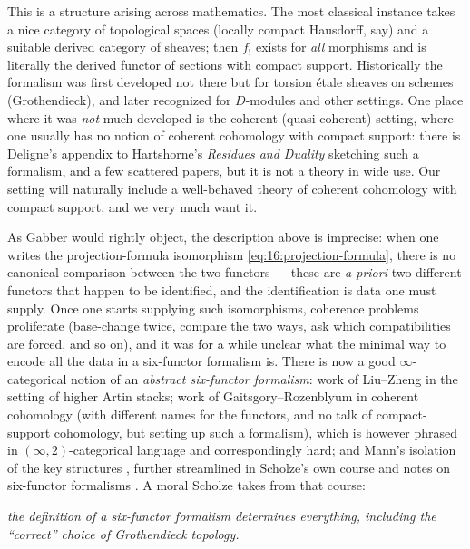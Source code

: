 \begin{remark}
\label{rmk:16:history}
This is a structure arising across mathematics. The most classical instance takes a
nice category of topological spaces (locally compact Hausdorff, say) and a suitable
derived category of sheaves; then $f_!$ exists for \emph{all} morphisms and is
literally the derived functor of sections with compact support. Historically the
formalism was first developed not there but for torsion \'etale sheaves on schemes
(Grothendieck), and later recognized for $D$-modules and other settings. One place
where it was \emph{not} much developed is the coherent (quasi-coherent) setting,
where one usually has no notion of coherent cohomology with compact support: there
is Deligne's appendix to Hartshorne's \emph{Residues and Duality}
\cite{Hartshorne_1966} sketching such a formalism, and a few scattered papers, but
it is not a theory in wide use. Our setting will naturally include a well-behaved
theory of coherent cohomology with compact support, and we very much want it.
\end{remark}

\begin{remark}
\label{rmk:16:abstract-6ff}
As Gabber would rightly object, the description above is imprecise: when one writes
the projection-formula isomorphism \eqref{eq:16:projection-formula}, there is no
canonical comparison between the two functors --- these are \emph{a priori} two
different functors that happen to be identified, and the identification is data one
must supply. Once one starts supplying such isomorphisms, coherence problems
proliferate (base-change twice, compare the two ways, ask which compatibilities are
forced, and so on), and it was for a while unclear what the minimal way to encode all
the data in a six-functor formalism is. There is now a good $\infty$-categorical
notion of an \emph{abstract six-functor formalism}: work of Liu--Zheng
\cite{liu2024enhancedoperationsbasechange} in the setting of higher Artin stacks;
work of Gaitsgory--Rozenblyum \cite{gaitsgory2017study} in coherent cohomology (with
different names for the functors, and no talk of compact-support cohomology, but
setting up such a formalism), which is however phrased in $(\infty,2)$-categorical
language and correspondingly hard; and Mann's isolation of the key structures
\cite{mann2022padic6functorformalismrigidanalytic}, further streamlined in Scholze's
own course and notes on six-functor formalisms \cite{scholze2023six}. A moral Scholze
takes from that course:
\begin{center}
\emph{the definition of a six-functor formalism determines everything, including the
``correct'' choice of Grothendieck topology.}
\end{center}
\end{remark}


